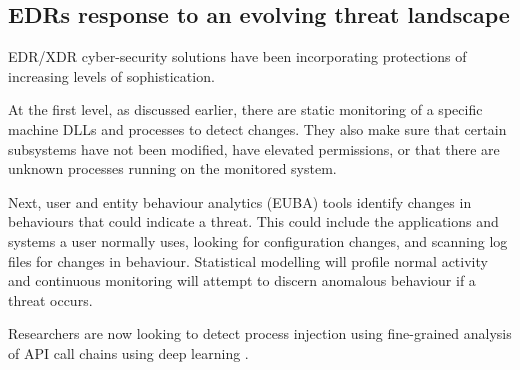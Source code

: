 




\subsection{EDRs response to an evolving threat landscape}

EDR/XDR cyber-security solutions have been incorporating protections of increasing levels of sophistication.

At the first level, as discussed earlier, there are static monitoring of a specific machine DLLs and processes to detect changes.  They also
make sure that certain subsystems have not been modified, have elevated permissions, or that there are unknown processes
running on the monitored system.

Next, user and entity behaviour analytics (EUBA) tools identify changes in behaviours that could indicate a threat.  This could include the
applications and systems a user normally uses, looking for configuration changes, and scanning log files for changes in behaviour.  Statistical
modelling will profile normal activity and continuous monitoring will attempt to discern anomalous behaviour if a threat occurs.

Researchers are now looking to detect process injection using fine-grained analysis of API call chains using deep learning \autocite{Wang:2022}.

